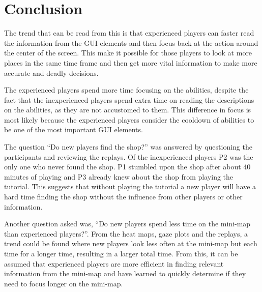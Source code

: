 \documentclass{report}
\begin{document}
\section{Conclusion}
The trend that can be read from this is that experienced players can faster read the information from the GUI elements and then focus back at the action around the center of the screen. This make it possible for those players to look at more places in the same time frame and then get more vital information to make more accurate and deadly decisions.

The experienced players spend more time focusing on the abilities, despite the fact that the inexperienced players spend extra time on reading the descriptions on the abilities, as they are not accustomed to them. This difference in focus is most likely because the experienced players consider the cooldown of abilities to be one of the most important GUI elements.

The question ``Do new players find the shop?'' was answered by questioning the participants and reviewing the replays. Of the inexperienced players P2 was the only one who never found the shop. P1 stumbled upon the shop after about 40 minutes of playing and P3 already knew about the shop from playing the tutorial. This suggests that without playing the tutorial a new player will have a hard time finding the shop without the influence from other players or other information.

Another question asked was, ``Do new players spend less time on the mini-map than experienced players?''. From the heat maps, gaze plots and the replays, a trend could be found where new players look less often at the mini-map but each time for a longer time, resulting in a larger total time. From this, it can be assumed that experienced players are more efficient in finding relevant information from the mini-map and have learned to quickly determine if they need to focus longer on the mini-map.
\end{document}
